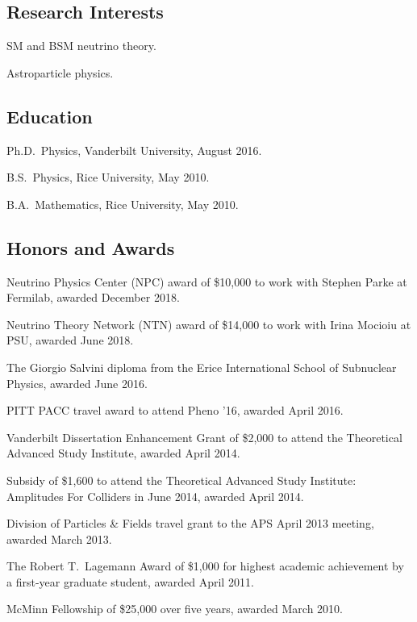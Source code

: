 \documentclass{article}
\renewenvironment{itemize}{
\begin{list}{}{
\setlength{\leftmargin}{.5em}}}{
\end{list}}
\begin{document}
\subsection*{Research Interests}
\begin{itemize}
\item SM and BSM neutrino theory.
\item Astroparticle physics.
\end{itemize}

\subsection*{Education}
\begin{itemize}
\item Ph.D.~Physics, Vanderbilt University, August 2016.
\item B.S.~Physics, Rice University, May 2010.
\item B.A.~Mathematics, Rice University, May 2010.
\end{itemize}

\subsection*{Honors and Awards}
\begin{itemize}
\item Neutrino Physics Center (NPC) award of \$10,000 to work with Stephen Parke at Fermilab, awarded December 2018.
\item Neutrino Theory Network (NTN) award of \$14,000 to work with Irina Mocioiu at PSU, awarded June 2018.
\item The Giorgio Salvini diploma from the Erice International School of Subnuclear Physics, awarded June 2016.
\item PITT PACC travel award to attend Pheno '16, awarded April 2016.
\item Vanderbilt Dissertation Enhancement Grant of \$2,000 to attend the Theoretical Advanced Study Institute, awarded April 2014.
\item Subsidy of \$1,600 to attend the Theoretical Advanced Study Institute: Amplitudes For Colliders in June 2014, awarded April 2014.
\item Division of Particles \& Fields travel grant to the APS April 2013 meeting, awarded March 2013.
\item The Robert T.~Lagemann Award of \$1,000 for highest academic achievement by a first-year graduate student, awarded April 2011.
\item McMinn Fellowship of \$25,000 over five years, awarded March 2010.
\end{itemize}
\end{document}
